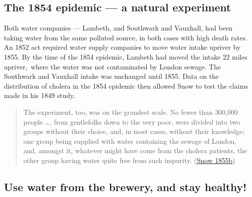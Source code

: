 \documentclass[
  10pt,
  b5paper]{book}
\begin{document}
\enlargethispage{11pt}

\hypertarget{the-1854-epidemic-a-natural-experiment}{%
\subsection*{The 1854 epidemic --- a natural experiment}\label{the-1854-epidemic-a-natural-experiment}}

Both water companies --- Lambeth, and Southwark and Vauxhall,
had been taking water from the same polluted source, in both
cases with high death rates. An 1852 act required water
supply companies to move water intake upriver by 1855. By
the time of the 1854 epidemic, Lambeth had moved the intake
22 miles upriver,~where the water was not
contaminated by London sewage. The Southwark and Vauxhall
intake was unchanged until 1855. Data on the distribution of
cholera in the 1854 epidemic then allowed Snow to test the
claims made in his 1849 study.


\begin{quote}
The experiment, too, was on the grandest scale. No fewer than
300,000 people \ldots, from gentlefolks down to the very poor, were
divided into two groups without their choice, and, in most cases,
without their knowledge; one group being supplied with water
containing the sewage of London, and, amongst it, whatever might
have come from the cholera patients, the other group having water
quite free from such impurity. (\protect\hyperlink{ref-snow1855mode}{Snow 1855b})
\end{quote}

\hypertarget{use-water-from-the-brewery-and-stay-healthy}{%
\subsection*{Use water from the brewery, and stay healthy!}\label{use-water-from-the-brewery-and-stay-healthy}}
\end{document}
